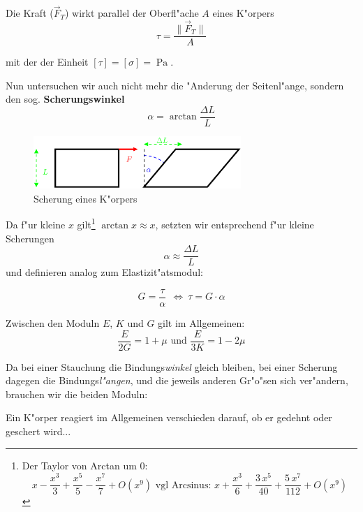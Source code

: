 \begin{Def}
Die Kraft ($\vec F_T$) wirkt parallel der Oberfl"ache $A$ eines K"orpers
\begin{equation}
   \label{eqn_def_schubspannung}
   \tau = \frac{\|\vec F_T\|}{A}
\end{equation}
\end{Def}
mit der der Einheit $[\tau] = [\sigma] = \operatorname{Pa}$.

Nun untersuchen wir auch nicht mehr die "Anderung der Seitenl"ange,
sondern den sog. \textbf{Scherungswinkel}
$$
\alpha = \arctan \frac{\Delta L}{L}
$$

\begin{figure}
   \centering
   \includegraphics[width=0.7\textwidth]{bilder/scherung}
   \caption{Scherung eines K"orpers}
   \label{abb_scherung}
\end{figure}
Da f"ur kleine $x$ gilt\footnote{Der Taylor von Arctan um
  $0$: $$x-\frac{{x}^{3}}{3}+\frac{{x}^{5}}{5}-\frac{{x}^{7}}{7}+O(x^9)
  \text{ vgl Arcsinus: }
x+\frac{{x}^{3}}{6}+\frac{3\,{x}^{5}}{40}+\frac{5\,{x}^{7}}{112}+O(x^9)
$$}
$\arctan x \approx x$, setzten wir entsprechend
f"ur kleine Scherungen
\begin{equation}
   \label{eq:60}
   \alpha \approx \frac{\Delta L}{L}
\end{equation}
und definieren analog zum Elastizit"atsmodul:
\begin{Def}
   \begin{equation}
      \label{eqn_def_schubmodul}
      G = \frac{\tau}{\alpha} ~ ~ \Leftrightarrow ~\boxed{\tau = G \cdot \alpha}
   \end{equation}
\end{Def}

Zwischen den Moduln $E$, $K$ und $G$ gilt im Allgemeinen:
\begin{equation}
   \label{eq:62}
   \boxed{
\frac{E}{2G} = 1 + \mu
} 
\text{ und }
\boxed{
\frac{E}{3K} = 1 - 2\mu
}
\end{equation}


Da bei einer Stauchung die Bindungs\emph{winkel} gleich bleiben, bei
einer Scherung dagegen die Bindungs\emph{l"angen}, und die jeweils
anderen Gr"o"sen sich ver"andern, brauchen wir die beiden Moduln:
\begin{Wichtig}
Ein K"orper reagiert im Allgemeinen verschieden darauf, ob er gedehnt oder
geschert wird...   
\end{Wichtig}




